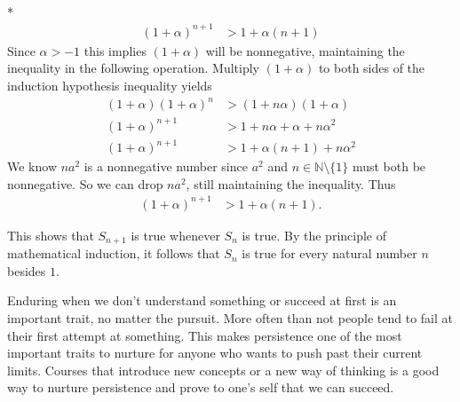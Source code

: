 \documentclass[10pt]{article}
\makeatletter
\newcommand{\N}{\mathbb{N}}
\newcommand{\al}{\alpha}
\newenvironment{question}[2][Question]{\begin{trivlist}
\item[\hskip \labelsep {\bfseries #1}\hskip \labelsep {\bfseries #2.}]}{\end{trivlist}}
\renewenvironment{proof}[1][\proofname]{\par
\pushQED{\qed}
\normalfont \topsep6\p@\@plus6\p@\relax
\trivlist
\item[\hskip\labelsep\itshape#1\@addpunct{.}]\mbox{}\\*}{\popQED\endtrivlist\@endpefalse}
\makeatother
\begin{document}
\begin{question}{7}
\begin{proof}
	\begin{align*}
		(1 + \al )^{n+1} &> 1 + \al(n + 1)
	\end{align*}
	Since $\al > -1$ this implies $(1+\al)$ will be nonnegative, maintaining the inequality in the following operation. Multiply $(1+\al)$ to both sides of the induction hypothesis inequality yields
	\begin{align*}
		(1+\al)(1 + \al )^n &> (1 + n \al)(1+\al) \\
		(1 + \al )^{n+1} &> 1+n\al+\al+n\al^2 \\
		(1 + \al )^{n+1} &> 1+\al(n+1)+n\al^2
	\end{align*}
	We know $na^2$ is a nonnegative number since $a^2$ and $n \in \N \setminus \{1\}$ must both be nonnegative. So we can drop $na^2$, still maintaining the inequality. Thus
	\begin{align*}
		(1 + \al )^{n+1} &> 1+\al(n+1).
	\end{align*}

\noindent
This shows that $S_{n+1}$ is true whenever $S_n$ is true. By the principle of mathematical induction, it follows that $S_n$ is true for every natural number $n$ besides $1$.
\end{proof}

Enduring when we don't understand something or succeed at first is an important trait, no matter the pursuit. More often than not people tend to fail at their first attempt at something. This makes persistence one of the most important traits to nurture for anyone who wants to push past their current limits. Courses that introduce new concepts or a new way of thinking is a good way to nurture persistence and prove to one's self that we can succeed.
\end{question}

\newpage
\end{document}

